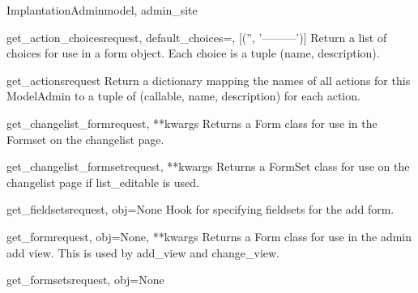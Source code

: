 \documentclass[letterpaper,10pt,english]{sphinxmanual}
\begin{document}
\begin{classdesc}{ImplantationAdmin}{model, admin\_site}
\hypertarget{data.admin.ImplantationAdmin.get_action_choices}{}\begin{methoddesc}{get\_action\_choices}{request, default\_choices=, {[}('', '---------'){]}}
Return a list of choices for use in a form object.  Each choice is a
tuple (name, description).
\end{methoddesc}

\hypertarget{data.admin.ImplantationAdmin.get_actions}{}\begin{methoddesc}{get\_actions}{request}
Return a dictionary mapping the names of all actions for this
ModelAdmin to a tuple of (callable, name, description) for each action.
\end{methoddesc}

\hypertarget{data.admin.ImplantationAdmin.get_changelist_form}{}\begin{methoddesc}{get\_changelist\_form}{request, **kwargs}
Returns a Form class for use in the Formset on the changelist page.
\end{methoddesc}

\hypertarget{data.admin.ImplantationAdmin.get_changelist_formset}{}\begin{methoddesc}{get\_changelist\_formset}{request, **kwargs}
Returns a FormSet class for use on the changelist page if list\_editable
is used.
\end{methoddesc}

\hypertarget{data.admin.ImplantationAdmin.get_fieldsets}{}\begin{methoddesc}{get\_fieldsets}{request, obj=None}
Hook for specifying fieldsets for the add form.
\end{methoddesc}

\hypertarget{data.admin.ImplantationAdmin.get_form}{}\begin{methoddesc}{get\_form}{request, obj=None, **kwargs}
Returns a Form class for use in the admin add view. This is used by
add\_view and change\_view.
\end{methoddesc}

\hypertarget{data.admin.ImplantationAdmin.get_formsets}{}\begin{methoddesc}{get\_formsets}{request, obj=None}\end{methoddesc}


\end{classdesc}
\end{document}
